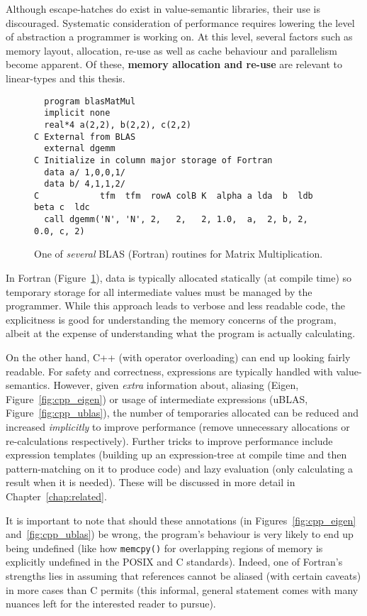 Although escape-hatches do exist in value-semantic libraries, their use is
discouraged. Systematic consideration of performance requires lowering the
level of abstraction a programmer is working on. At this level, several
factors such as memory layout, allocation, re-use as well as cache behaviour
and parallelism become apparent. Of these, \textbf{memory allocation and
re-use} are relevant to linear-types and this thesis.

\begin{figure}[tbp]
    \begin{verbatim}
  program blasMatMul
  implicit none
  real*4 a(2,2), b(2,2), c(2,2)
C External from BLAS
  external dgemm
C Initialize in column major storage of Fortran
  data a/ 1,0,0,1/
  data b/ 4,1,1,2/
C            tfm  tfm  rowA colB K  alpha a lda  b  ldb beta c  ldc
  call dgemm('N', 'N', 2,   2,   2, 1.0,  a,  2, b, 2,  0.0, c, 2)
    \end{verbatim}
    \caption{One of \emph{several} BLAS (Fortran) routines for Matrix
    Multiplication.}\label{fig:fortran_blas}
\end{figure}

In Fortran (Figure~\ref{fig:fortran_blas}), data is typically allocated
statically (at compile time) so temporary storage for all intermediate values
must be managed by the programmer. While this approach leads to verbose and
less readable code, the explicitness is good for understanding the memory
concerns of the program, albeit at the expense of understanding what the
program is actually calculating.

On the other hand, C++ (with operator overloading) can end up looking fairly
readable. For safety and correctness, expressions are typically handled with
value-semantics. However, given \emph{extra} information about, aliasing
(Eigen, Figure~\ref{fig:cpp_eigen}) or usage of intermediate expressions
(uBLAS, Figure~\ref{fig:cpp_ublas}), the number of temporaries allocated can be
reduced and increased \emph{implicitly} to improve performance (remove
unnecessary allocations or re-calculations respectively). Further tricks to
improve performance include expression templates (building up an
expression-tree at compile time and then pattern-matching on it to produce
code) and lazy evaluation (only calculating a result when it is needed). These
will be discussed in more detail in Chapter~\ref{chap:related}.

It is important to note that should these annotations (in
Figures~\ref{fig:cpp_eigen} and~\ref{fig:cpp_ublas}) be wrong, the program's
behaviour is very likely to end up being undefined (like how \texttt{memcpy()}
for overlapping regions of memory is explicitly undefined in the POSIX and C
standards). Indeed, one of Fortran's strengths lies in assuming that references
cannot be aliased (with certain caveats) in more cases than C permits (this
informal, general statement comes with many nuances left for the interested
reader to pursue).

